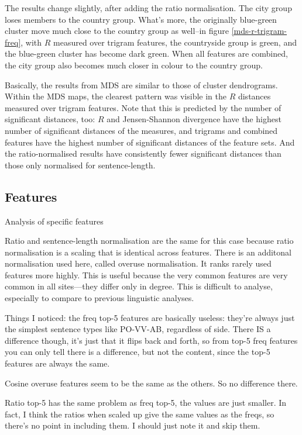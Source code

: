 The results change slightly, after adding the ratio normalisation. The
city group loses members to the country group. What's more, the
originally blue-green cluster move much close to the country group
as well--in figure \ref{mds-r-trigram-freq}, with
$R$ measured over trigram features, the countryside group is green,
and the blue-green cluster has become dark green. When all features
are combined, the city group also becomes much closer in colour to the
country group.

Basically, the results from MDS are similar to those of cluster
dendrograms. Within the MDS maps, the clearest pattern was visible in
the $R$ distances measured over trigram features. Note that this is
predicted by the number of significant distances, too: $R$ and
Jensen-Shannon divergence have the highest number of significant
distances of the measures, and trigrams and combined features have the
highest number of significant distances of the feature sets. And the
ratio-normalised results have consistently fewer significant distances
than those only normalised for sentence-length.

\subsection{Features}

Analysis of specific features

Ratio and sentence-length normalisation are the same for this case
because ratio normalisation is a scaling that is identical across
features. There is an additonal normalisation used here, called
overuse normalisation. It ranks rarely used features more highly.
This is useful because the very common features are very common in all
sites---they differ only in degree. This is difficult to analyse,
especially to compare to previous linguistic analyses.

Things I noticed: the freq top-5 features are basically useless:
they're always just the simplest sentence types like PO-VV-AB,
regardless of side. There IS a difference though, it's just that it
flips back and forth, so from top-5 freq features you can only tell there is
a difference, but not the content, since the top-5 features are always
the same.

Cosine overuse features seem to be the same as the others. So no
difference there.

Ratio top-5 has the same problem as freq top-5, the values are just
smaller. In fact, I think the ratios when scaled up give the same
values as the freqs, so there's no point in including them. I should
just note it and skip them.


